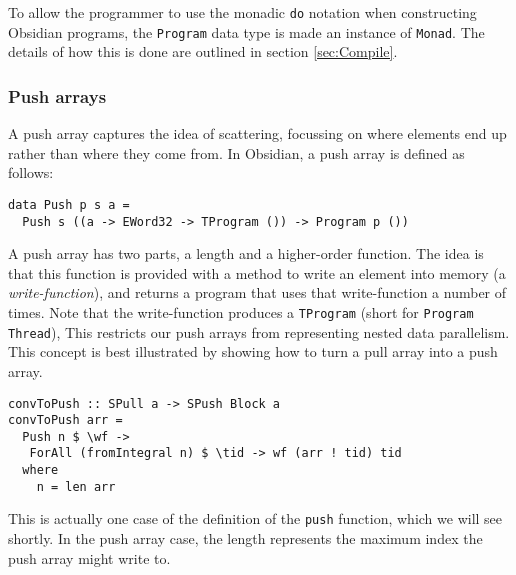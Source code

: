 To allow the programmer to use the monadic {\tt do} notation when constructing Obsidian 
programs, the {\tt Program} data type is made an instance of {\tt Monad}. The details 
of how this is done are outlined in section \ref{sec:Compile}.




\subsubsection{Push arrays} 
\label{sec:PushArrays}

A push array captures the idea of scattering, focussing on where 
elements end up rather than where they come from. In Obsidian, a push array 
is defined as follows: 

\begin{small}
\begin{verbatim}
data Push p s a =
  Push s ((a -> EWord32 -> TProgram ()) -> Program p ())
\end{verbatim}
\end{small}

A push array has two parts, a length and a higher-order function. 
The idea is that this function is provided with a method to write an 
element into memory (a {\em write-function}), and returns a program 
that uses that write-function a number of times. Note that the 
write-function produces a {\tt TProgram} (short for {\tt Program Thread}), This 
restricts our push arrays from representing nested data parallelism. 
This concept is best illustrated by showing how to turn a pull array into a push array. 

\begin{small} 
\begin{verbatim} 
convToPush :: SPull a -> SPush Block a
convToPush arr =
  Push n $ \wf ->
   ForAll (fromIntegral n) $ \tid -> wf (arr ! tid) tid
  where
    n = len arr       
\end{verbatim}
\end{small}

\noindent
This is actually one case of the definition of the \verb!push! function, which we will see shortly.
In the push array case, the length represents the maximum index the push array 
might write to.

